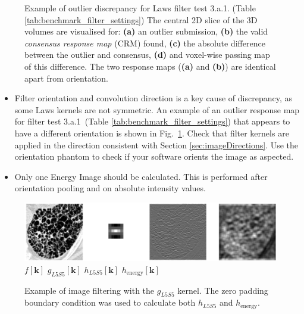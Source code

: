 \documentclass[fleqn,a4paper,oneside,openany]{book}
\begin{document}
\begin{figure}[!t]
\begin{minipage}[b]{0.45\textwidth}
   \end{minipage} 
   \caption{Example of outlier discrepancy for Laws filter test 3.a.1. (Table \ref{tab:benchmark_filter_settings}) The central 2D slice of the 3D volumes are visualised for: \textbf{(a)} an outlier submission, \textbf{(b)} the valid \textit{consensus response map} (CRM) found, \textbf{(c)} the absolute difference between the outlier and consensus,  \textbf{(d)} and voxel-wise passing map of this difference. The two response maps (\textbf{(a)} and \textbf{(b)}) are identical apart from orientation. }
   \label{fig:3a1_Laws_example}
\end{figure}


\vspace{2mm}
\begin{tcolorbox}[width=150mm, halign=left, colframe=black, colback=white, boxsep=0mm, arc=3mm, colframe=black!50!white,
title=Implementation Troubleshooting, title filled=true, fonttitle=\bfseries]
\begin{itemize}
\item Filter orientation and convolution direction is a key cause of discrepancy, as some Laws kernels are not symmetric. %
An example of an outlier response map for filter test 3.a.1\ (Table \ref{tab:benchmark_filter_settings}) that appears to have a different orientation is shown in Fig.\ \ref{fig:3a1_Laws_example}.
Check that filter kernels are applied in the direction consistent with Section \ref{sec:imageDirections}. Use the orientation phantom to check if your software orients the image as aspected. 
\item Only one Energy Image should be calculated. This is performed after orientation pooling and on absolute intensity values.
\end{itemize}
\end{tcolorbox}




%
\begin{figure}
\centering
\includegraphics[trim = 0 0 0 0, clip, width=\linewidth]{Laws_example.png}\\
$f[\boldsymbol{k}]$
\hspace{2.5cm}
$g_{L5S5}[\boldsymbol{k}]$
\hspace{2.1cm}
$h_{L5S5}[\boldsymbol{k}]$
\hspace{2.3cm}
$h_{\text{energy}}[\boldsymbol{k}]$
\caption{Example of image filtering with the $g_{L5S5}$ kernel. The zero padding boundary condition was used to calculate both $h_{L5S5}$ and $h_{\text{energy}}$.}
  \label{fig:LawsExample}
\end{figure}
%
\end{document}
